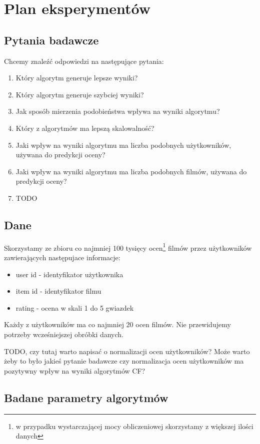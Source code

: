 \documentclass[12pt, a4paper]{article}
\begin{document}
\section{Plan eksperymentów}

\subsection{Pytania badawcze}
Chcemy znaleźć odpowiedzi na następujące pytania:

\begin{enumerate}
\item Który algorytm generuje lepsze wyniki?
\item Który algorytm generuje szybciej wyniki?
\item Jak sposób mierzenia podobieństwa wpływa na wyniki algorytmu?
\item Który z algorytmów ma lepszą skalowalność?
\item Jaki wpływ na wyniki algorytmu ma liczba podobnych użytkowników, używana do predykcji oceny?
\item Jaki wpływ na wyniki algorytmu ma liczba podobnych filmów, używana do predykcji oceny?
\item TODO
\end{enumerate}

\subsection{Dane}
Skorzystamy ze zbioru co najmniej 100 tysięcy ocen\footnote{w przypadku wystarczającej mocy 
obliczeniowej skorzystamy z większej ilości danych} filmów przez użytkowników zawierających 
następujace informacje:

\begin{itemize}
\item user id - identyfikator użytkownika
\item item id - identyfikator filmu
\item rating - ocena w skali 1 do 5 gwiazdek
\end{itemize}

Każdy z użytkowników ma co najmniej 20 ocen filmów. Nie przewidujemy potrzeby wcześniejszej obróbki danych.

TODO, czy tutaj warto napisać o normalizacji ocen użytkowników? Może warto żeby to było jakieś pytanie badawcze czy normalizacja ocen użytkowników ma pozytywny wpływ na wyniki algorytmów CF?

\subsection{Badane parametry algorytmów}
\end{document}
